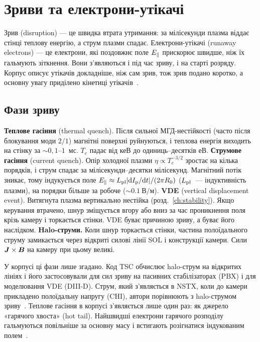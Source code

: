 \chapter{Зриви та електрони-утікачі}\label{ch:disruptions}

Зрив (disruption) --- це швидка втрата утримання: за мілісекунди плазма віддає стінці теплову енергію,
а струм плазми спадає. Електрони-утікачі (runaway electrons) --- це електрони, які поздовжнє поле
$E_{\parallel}$ прискорює швидше, ніж їх гальмують зіткнення. Вони з'являються і під час зриву, і на старті
розряду. Корпус описує утікачів докладніше, ніж сам зрив, тож зрив подано коротко, а основну увагу
приділено кінетиці утікачів~\cite{Hoppe2022,Marchuk2025}.

\section{Фази зриву}\label{sec:09-phases}

\begin{outofcorpus}
\textbf{Теплове гасіння} (thermal quench). Після сильної МГД-нестійкості (часто після блокування моди
$2/1$) магнітні поверхні руйнуються, і теплова енергія виходить на стінку за $\sim0{,}1$--$1$~мс. $T_e$
падає від кеВ до одиниць--десятків еВ.
\textbf{Струмове гасіння} (current quench). Опір холодної плазми $\eta\propto T_e^{-3/2}$ зростає на
кілька порядків, і струм спадає за мілісекунди--десятки мілісекунд. Магнітний потік зникає, тому
індукується поле $E_{\parallel}\approx L_{\mathrm{pl}}|\mathrm{d}I_{\mathrm{p}}/\mathrm{d} t|/(2\pi R_0)$ ($L_{\mathrm{pl}}$~--- індуктивність плазми), на порядки більше за робоче
($\sim\SI{0,1}{В/м}$).
\textbf{VDE} (vertical displacement event). Витягнута плазма вертикально нестійка (розд.~\ref{ch:stability}).
Якщо керування втрачено, шнур зміщується вгору або вниз за час проникнення поля крізь камеру і
торкається стінки. VDE буває причиною зриву, а буває його наслідком.
\textbf{Halo-струми.} Коли шнур торкається стінки, частина полоїдального струму замикається через
відкриті силові лінії SOL і конструкції камери. Сили $\bm{J}\times\bm{B}$ на камеру при цьому великі.
\end{outofcorpus}

У корпусі ці фази лише згадано. Код TSC обчислює halo-струм на відкритих лініях і його застосовували для сил зриву на пасивних стабілізаторах (PBX) і для моделювання VDE
(DIII-D). Струм, який з'являється в NSTX, коли до камери прикладено полоїдальну напругу (CHI), автори
порівнюють з halo-струмом зриву~\cite[с.~3--4]{Jardin2000}. Теплове гасіння в корпусі з'являється
лише один раз: як джерело «гарячого хвоста» (hot tail). Найшвидші електрони гарячого розподілу
гальмуються повільніше за основну масу і встигають розігнатися індукованим полем~\cite[с.~9]{Hoppe2022}.

